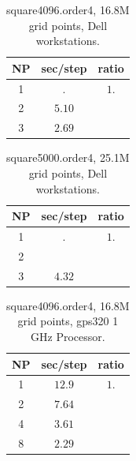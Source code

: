 \documentclass[11pt]{article}
\begin{document}
\begin{table}[hbt]
\begin{center}\footnotesize
\begin{tabular}{|c|c|c|} \hline 
     NP       & sec/step   & ratio \\   \hline\hline 
     1        &  $.   $    & $ 1. $   \\ 
     2        &  $5.10$    & $    $   \\ 
     3        &  $2.69$    & $    $   \\ \hline 
\end{tabular}		
\end{center}		
\caption{square4096.order4, 16.8M grid points, Dell workstations.}
 \label{tab:box} 
\end{table}

\begin{table}[hbt]
\begin{center}\footnotesize
\begin{tabular}{|c|c|c|} \hline 
     NP       & sec/step   & ratio \\   \hline\hline 
     1        &  $.   $    & $ 1. $   \\ 
     2        &  $    $    & $    $   \\ 
     3        &  $4.32$    & $    $   \\ \hline 
\end{tabular}		
\end{center}		
\caption{square5000.order4, 25.1M grid points, Dell workstations.}
 \label{tab:box} 
\end{table}

\begin{table}[hbt]
\begin{center}\footnotesize
\begin{tabular}{|c|c|c|} \hline 
     NP       & sec/step   & ratio \\   \hline\hline 
     1        &  $12.9$    & $ 1. $   \\ 
     2        &  $7.64$    & $    $   \\ 
     4        &  $3.61$    & $    $   \\ \hline 
     8        &  $2.29$    & $    $   \\ \hline 
\end{tabular}		
\end{center}		
\caption{square4096.order4, 16.8M grid points, gps320 1 GHz Processor.}
 \label{tab:box} 
\end{table}
\end{document}
